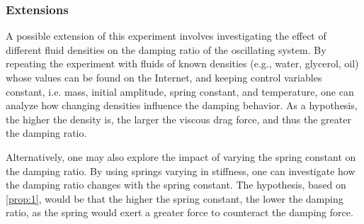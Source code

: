\documentclass[a4paper,12pt]{article}
\begin{document}
\subsubsection{Extensions}

A possible extension of this experiment involves investigating the effect of different fluid densities on the damping ratio of the oscillating system. By repeating the experiment with fluids of known densities (e.g., water, glycerol, oil) whose values can be found on the Internet, and keeping control variables constant, i.e. mass, initial amplitude, spring constant, and temperature, one can analyze how changing densities influence the damping behavior. As a hypothesis, the higher the density is, the larger the viscous drag force, and thus the greater the damping ratio.

Alternatively, one may also explore the impact of varying the spring constant on the damping ratio. By using springs varying in stiffness, one can investigate how the damping ratio changes with the spring constant. The hypothesis, based on \cref{prop:1}, would be that the higher the spring constant, the lower the damping ratio, as the spring would exert a greater force to counteract the damping force.

\pagebreak

\printbibliography[
  heading=bibintoc,
  title={Bibliography}
]
\end{document}
